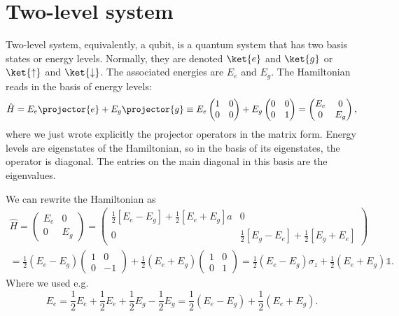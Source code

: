 \documentclass[fontsize=9pt,bookmarkpackage=false]{scrartcl}
\begin{document}
\section{Two-level system} %
\label{sec:two_level_system}

Two-level system, equivalently, a qubit, is a quantum system that has two basis states or energy levels.
Normally, they are denoted $\ket{e}$ and $\ket{g}$ or $\ket{\uparrow}$ and $\ket{\downarrow}$.
The associated energies are $E_e$ and $E_g$.
The Hamiltonian reads in the basis of energy levels:
\begin{equation}
  \hat H = E_e \projector{e} + E_g \projector{g}
  \equiv
  E_e
  \begin{pmatrix}
    1 & 0 \\ 0 & 0
  \end{pmatrix}
  +
  E_g
  \begin{pmatrix}
    0 & 0 \\ 0 & 1
  \end{pmatrix}
  =
  \begin{pmatrix}
    E_e & 0 \\ 0 & E_g
  \end{pmatrix}
  ,
\end{equation}
where we just wrote explicitly the projector operators in the matrix form.
Energy levels are eigenstates of the Hamiltonian, so in the basis of its eigenstates, the operator is diagonal.
The entries on the main diagonal in this basis are the eigenvalues.

We can rewrite the Hamiltonian as
\begin{multline}
  \label{eq:qubit:hamiltonian}
  \hat H = 
  \begin{pmatrix}
    E_e & 0 \\ 0 & E_g
  \end{pmatrix}
  =
  \begin{pmatrix}
    \frac 12 \left[ E_e - E_g \right] + \frac 12 \left[ E_e + E_g \right]a & 0
    \\
    0 &
    \frac 12  \left[ E_g - E_e \right] + \frac 12 \left[ E_g + E_e \right]
  \end{pmatrix}
  \\
  =
  \frac 12 ( E_e - E_g )
  \begin{pmatrix}
    1 & 0 \\ 0 & -1
  \end{pmatrix}
  + \frac 12 ( E_e + E_g )
  \begin{pmatrix}
    1 & 0 \\ 0 & 1
  \end{pmatrix}
  =
  \frac 12 ( E_e - E_g ) \sigma_z + \frac 12 ( E_e + E_g ) \mathbb 1.
\end{multline}
Where we used e.g.
\begin{equation}
  E_e = \frac 12 E_e + \frac 12 E_e + \frac 12 E_g - \frac 12 E_g
  =
  \frac 12 ( E_e - E_g ) + \frac 12 ( E_e + E_g ).
\end{equation}
\end{document}
